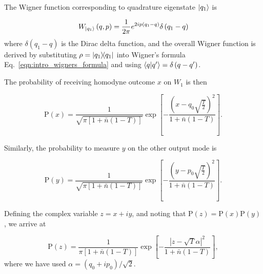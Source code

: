The Wigner function corresponding to quadrature eigenstate $\ket{q_1}$ is

\begin{equation}
W_{\ket{q_1}}\left(q, p\right) = \frac{1}{2 \pi} e^{2 i p\left(q_1 - q\right)} \delta\left(q_1 - q\right)
\end{equation}
where $\delta\left(q_1 - q\right)$ is the Dirac delta function, and the overall Wigner function is derived by substituting $\rho = \dyad{q_1}$ into Wigner's formula Eq.~\ref{eqn:intro_wigners_formula} and using $\ip{q}{q^\prime} = \delta\left(q - q^\prime\right)$.

The probability of receiving homodyne outcome $x$ on $W_1$ is then 


\begin{equation}\label{eqn:prob_homodyne_x}
\text{P}\left(x\right) = \frac{1}{\sqrt{\pi \left[1 + \bar{n}\left(1-T\right)\right]}}\exp\left[- \frac{\left(x - q_0 \sqrt{\frac{T}{2}}\right)^2}{1 + \bar{n}\left(1-T\right)} \right].
\end{equation}

\noindent Similarly, the probability to measure $y$ on the other output mode is

\begin{equation}
\text{P}\left(y\right) = \frac{1}{\sqrt{\pi \left[1 + \bar{n}\left(1-T\right)\right]}}\exp\left[- \frac{\left(y - p_0 \sqrt{\frac{T}{2}}\right)^2}{1 + \bar{n}\left(1-T\right)} \right].
\end{equation}

\noindent Defining the complex variable $z = x + i y$, and noting that $\text{P}\left(z\right) = \text{P}\left(x\right)\text{P}\left(y\right)$, we arrive at 

\begin{equation}\label{eqn:prob_noisy_output}
\text{P}\left(z\right) = \frac{1}{\pi \left[1 + \bar{n}\left(1-T\right)\right]} \exp\left[- \frac{\left| z - \sqrt{T} \alpha \right|^2}{1 + \bar{n}\left(1-T\right)} \right],
\end{equation}
where we have used $\alpha = \left(q_0 + i p_0\right)/\sqrt{2}$.


